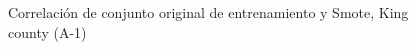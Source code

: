 \begin{figure}[H]
    \centering
    
    \caption{Correlación de conjunto original de entrenamiento y Smote, King county (A-1)}
    \label{pairwise-king county-a-1-smote-enc}
\end{figure}